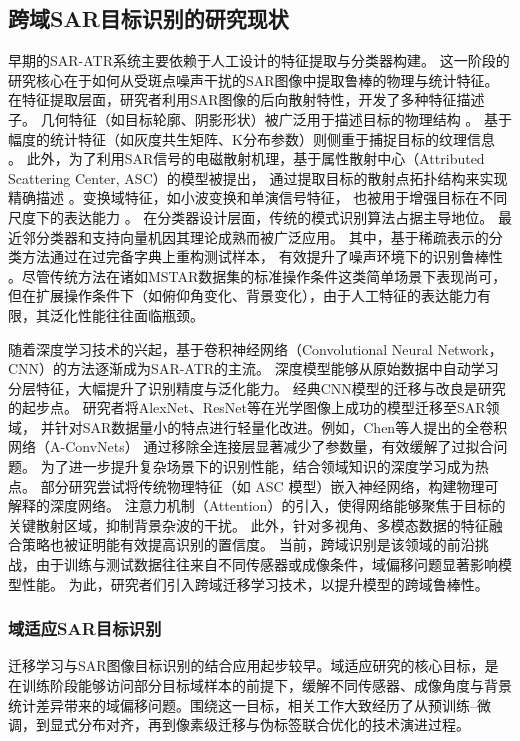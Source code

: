 \subsection{跨域SAR目标识别的研究现状}
早期的SAR-ATR系统主要依赖于人工设计的特征提取与分类器构建。
这一阶段的研究核心在于如何从受斑点噪声干扰的SAR图像中提取鲁棒的物理与统计特征。
在特征提取层面，研究者利用SAR图像的后向散射特性，开发了多种特征描述子。
几何特征（如目标轮廓、阴影形状）被广泛用于描述目标的物理结构 \cite{sun2007adaptive,papson2012classification}。
基于幅度的统计特征（如灰度共生矩阵、K分布参数）则侧重于捕捉目标的纹理信息 \cite{fukuda2001support}。
此外，为了利用SAR信号的电磁散射机理，基于属性散射中心（Attributed Scattering Center, ASC）的模型被提出，
通过提取目标的散射点拓扑结构来实现精确描述 \cite{duan2014polarimetric,he2014forward}。变换域特征，如小波变换和单演信号特征，
也被用于增强目标在不同尺度下的表达能力 \cite{achim2003sar}。
在分类器设计层面，传统的模式识别算法占据主导地位。
最近邻分类器和支持向量机因其理论成熟而被广泛应用\cite{zhao2002support,blanzieri2008nearest}。
其中，基于稀疏表示的分类方法通过在过完备字典上重构测试样本，
有效提升了噪声环境下的识别鲁棒性 \cite{dong2015sar}。尽管传统方法在诸如MSTAR数据集的标准操作条件这类简单场景下表现尚可，
但在扩展操作条件下（如俯仰角变化、背景变化），由于人工特征的表达能力有限，其泛化性能往往面临瓶颈。

随着深度学习技术的兴起，基于卷积神经网络（Convolutional Neural Network，CNN）的方法逐渐成为SAR-ATR的主流。
深度模型能够从原始数据中自动学习分层特征，大幅提升了识别精度与泛化能力。
经典CNN模型的迁移与改良是研究的起步点。
研究者将AlexNet、ResNet等在光学图像上成功的模型迁移至SAR领域，
并针对SAR数据量小的特点进行轻量化改进。例如，Chen等人提出的全卷积网络（A-ConvNets）
通过移除全连接层显著减少了参数量，有效缓解了过拟合问题\cite{chen2016target}。
为了进一步提升复杂场景下的识别性能，结合领域知识的深度学习成为热点。
部分研究尝试将传统物理特征（如 ASC 模型）嵌入神经网络，构建物理可解释的深度网络\cite{feng2021sar,zhang2025masff}。
注意力机制（Attention）的引入，使得网络能够聚焦于目标的关键散射区域，抑制背景杂波的干扰\cite{zhang2020convolutional}。
此外，针对多视角、多模态数据的特征融合策略也被证明能有效提高识别的置信度\cite{pei2017sar}。
当前，跨域识别是该领域的前沿挑战，由于训练与测试数据往往来自不同传感器或成像条件，域偏移问题显著影响模型性能。
为此，研究者们引入跨域迁移学习技术，以提升模型的跨域鲁棒性。

\subsubsection{域适应SAR目标识别}
迁移学习与SAR图像目标识别的结合应用起步较早。域适应研究的核心目标，是在训练阶段能够访问部分目标域样本的前提下，缓解不同传感器、成像角度与背景统计差异带来的域偏移问题。围绕这一目标，相关工作大致经历了从预训练--微调，到显式分布对齐，再到像素级迁移与伪标签联合优化的技术演进过程。


